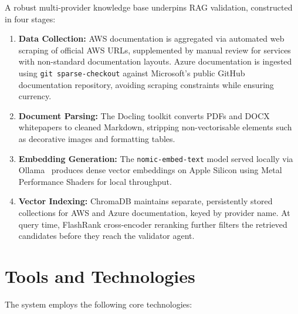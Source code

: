 A robust multi-provider knowledge base underpins RAG validation, constructed in four stages:

\begin{enumerate}
    \item \textbf{Data Collection:} AWS documentation is aggregated via automated web scraping of official AWS URLs, supplemented by manual review for services with non-standard documentation layouts. Azure documentation is ingested using \texttt{git sparse-checkout} against Microsoft's public GitHub documentation repository, avoiding scraping constraints while ensuring currency.
    \item \textbf{Document Parsing:} The Docling toolkit \cite{docling2025paper, docling2024web} converts PDFs and DOCX whitepapers to cleaned Markdown, stripping non-vectorisable elements such as decorative images and formatting tables.
    \item \textbf{Embedding Generation:} The \texttt{nomic-embed-text} model served locally via Ollama~\cite{ollama2024web} produces dense vector embeddings on Apple Silicon using Metal Performance Shaders \cite{apple2024mps} for local throughput.
    \item \textbf{Vector Indexing:} ChromaDB \cite{chromadb2024} maintains separate, persistently stored collections for AWS and Azure documentation, keyed by provider name. At query time, FlashRank cross-encoder reranking further filters the retrieved candidates before they reach the validator agent.
\end{enumerate}

\section{Tools and Technologies}

The system employs the following core technologies:

